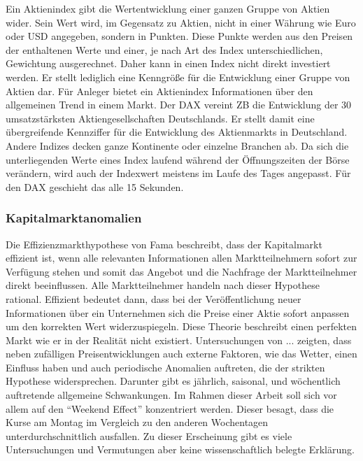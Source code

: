 Ein Aktienindex gibt die Wertentwicklung einer ganzen Gruppe von Aktien wider. Sein Wert wird, im Gegensatz zu Aktien, nicht in einer Währung wie Euro oder \gls{USD} angegeben, sondern in Punkten. Diese Punkte werden aus den Preisen der enthaltenen Werte und einer, je nach Art des Index unterschiedlichen, Gewichtung ausgerechnet. Daher kann in einen Index nicht direkt investiert werden. Er stellt lediglich eine Kenngröße für die Entwicklung einer Gruppe von Aktien dar. Für Anleger bietet ein Aktienindex Informationen über den allgemeinen Trend in einem Markt. Der \gls{DAX} vereint \gls{ZB} die Entwicklung der 30 umsatzstärksten Aktiengesellschaften Deutschlands. Er stellt damit eine übergreifende Kennziffer für die Entwicklung des Aktienmarkts in Deutschland. Andere Indizes decken ganze Kontinente oder einzelne Branchen ab. Da sich die unterliegenden Werte eines Index laufend während der Öffnungszeiten der Börse verändern, wird auch der Indexwert meistens im Laufe des Tages angepasst. Für den \gls{DAX} geschieht das alle 15 Sekunden.

\subsubsection{Kapitalmarktanomalien}



Die Effizienzmarkthypothese von Fama beschreibt, dass der Kapitalmarkt effizient ist, wenn alle relevanten Informationen allen Marktteilnehmern sofort zur Verfügung stehen und somit das Angebot und die Nachfrage der Marktteilnehmer direkt beeinflussen. Alle Marktteilnehmer handeln nach dieser Hypothese rational. Effizient bedeutet dann, dass bei der Veröffentlichung neuer Informationen über ein Unternehmen sich die Preise einer Aktie sofort anpassen um den korrekten Wert widerzuspiegeln. Diese Theorie beschreibt einen perfekten Markt wie er in der Realität nicht existiert. Untersuchungen von ... zeigten, dass neben zufälligen Preisentwicklungen auch externe Faktoren, wie das Wetter, einen Einfluss haben und auch periodische Anomalien auftreten, die der strikten Hypothese widersprechen. Darunter gibt es jährlich, saisonal, und wöchentlich auftretende allgemeine Schwankungen. Im Rahmen dieser Arbeit soll sich vor allem auf den \enquote{Weekend Effect} konzentriert werden. Dieser besagt, dass die Kurse am Montag im Vergleich zu den anderen Wochentagen unterdurchschnittlich ausfallen. Zu dieser Erscheinung gibt es viele Untersuchungen und Vermutungen aber keine wissenschaftlich belegte Erklärung.

